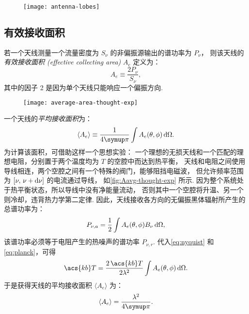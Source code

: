 \begin{figure}[htp]
  \centering
  \texttt{[image: antenna-lobes]}
  \label{fig:lobes}
\end{figure}

\subsection{有效接收面积}

若一个天线测量一个流量密度为 $S_{\nu}$ 的非偏振源输出的谱功率为 $P_{\nu}$，
则该天线的\emph{有效接收面积 (effective collecting area)} $A_e$ 定义为：
\begin{equation}
  \label{eq:area-eff}
  A_e \equiv \frac{2 P_{\nu}}{S_{\nu}} ,
\end{equation}
其中的因子 2 是因为单个天线只能响应一个偏振方向.

\begin{figure}[htp]
  \centering
  \texttt{[image: average-area-thought-exp]}
  \label{fig:Aavg-thought-exp}
\end{figure}

一个天线的\emph{平均接收面积}为：
\begin{equation}
  \label{eq:area-avg1}
  \langle A_e \rangle
    \equiv \frac{1}{4\Cpi} \int A_e(\theta,\phi) \,\D{\Omega} .
\end{equation}
为计算该面积，可借助这样一个思想实验：
一个理想的无损天线和一个匹配的理想电阻，分别置于两个温度均为 $T$ 的空腔中而达到热平衡，
天线和电阻之间使用导线相连，两个空腔之间有一个特殊的阀门，能够阻挡电磁波，
但允许频率范围为 $[\nu, \,\nu+\mathrm{d}\nu]$ 的电流通过导线，
如\autoref{fig:Aavg-thought-exp} 所示.
因为整个系统处于热平衡状态，所以导线中没有净能量流动，
否则其中一个空腔将升温、另一个则冷却，违背热力学第二定律.
因此，天线接收各方向的无偏振黑体辐射所产生的总谱功率为：
\begin{equation}
  P_{\nu,a} = \frac{1}{2} \int A_e(\theta,\phi) B_{\nu} \,\mathrm{d}\Omega ,
\end{equation}
该谱功率必须等于电阻产生的热噪声的谱功率 $P_{\nu,r}$.
代入\autoref{eq:nyquist} 和\autoref{eq:planck}，可得
\begin{equation}
  \acs{kb}T = \frac{2\,\acs{kb}T}{2\lambda^2}
    \int A_e(\theta,\phi) \,\D{\Omega} .
\end{equation}
于是获得天线的平均接收面积 $\langle A_e \rangle$ 为：
\begin{equation}
  \label{eq:area-avg}
  \langle A_e \rangle = \frac{\lambda^2}{4\Cpi}.
\end{equation}

